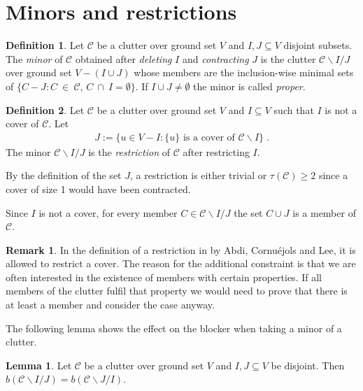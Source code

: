 \documentclass[a4paper, 12pt]{scrbook}
\theoremstyle{definition}
\newtheorem*{definition}{Definition}
\newtheorem*{remark}{Remark}
\newtheorem{lemma}[theorem]{Lemma}
\begin{document}
\section{Minors and restrictions}
\begin{definition}
    Let $\mathcal{C}$ be a clutter over ground set $V$ and $I, J \subseteq V$ disjoint subsets.
    The \emph{minor} of $\mathcal{C}$ obtained after \emph{deleting} $I$ and \emph{contracting} $J$ is the clutter $\mathcal{C} \backslash I / J$ over ground set $V - (I \cup J)$ whose members are the inclusion-wise minimal sets of $\{C-J : C~\in~\mathcal{C},\, C~\cap~I = \emptyset\}$.
    If $I \cup J \neq \emptyset$ the minor is called \emph{proper}.
\end{definition}

\begin{definition}
    Let $\mathcal{C}$ be a clutter over ground set $V$ and $I \subseteq V$ such that $I$ is not a cover of $\mathcal{C}$.
    Let
    \begin{align*}
        J := \{u \in V-I : \{u\} \text{ is a cover of } \mathcal{C} \backslash I\} \;.
    \end{align*}
    The minor $\mathcal{C} \backslash I / J$ is the \emph{restriction} of $\mathcal{C}$ after restricting $I$.
\end{definition}

By the definition of the set $J$, a restriction is either trivial or $\tau(\mathcal{C}) \geq 2$ since a cover of size 1 would have been contracted.

Since $I$ is not a cover, for every member $C \in \mathcal{C} \backslash I /J$ the set $C \cup J$ is a member of $\mathcal{C}$.

\begin{remark}
    In the definition of a restriction in \cite{restrictions} by Abdi, Cornuéjols and Lee, it is allowed to restrict a cover.
    The reason for the additional constraint is that we are often interested in the existence of members with certain properties.
    If all members of the clutter fulfil that property we would need to prove that there is at least a member and consider the case anyway.
\end{remark}

The following lemma shows the effect on the blocker when taking a minor of a clutter.
\begin{lemma}
    Let $\mathcal{C}$ be a clutter over ground set $V$ and $I,J \subseteq V$ be disjoint.
    Then $b(\mathcal{C}\backslash I /J) = b(\mathcal{C} \backslash J / I)$.
\end{lemma}
\end{document}
